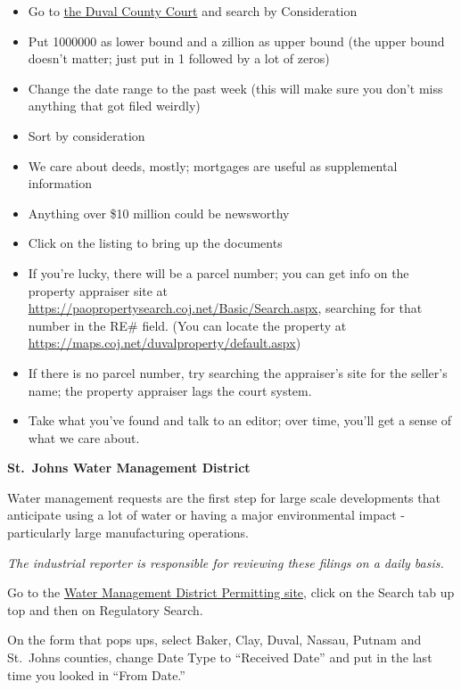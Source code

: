 \documentclass[
  11pt,
  american,
  letterpaperpaper,
  extrafontsizes,onecolumn,openright
  ]{memoir}
\providecommand{\tightlist}{%
  \setlength{\itemsep}{0pt}\setlength{\parskip}{0pt}}
\begin{document}
\begin{itemize}
\tightlist
\item
  Go to \href{https://oncore.duvalclerk.com/search/Disclaimer?st=/search/SearchTypeConsideration}{the Duval County Court} and search by Consideration
\item
  Put 1000000 as lower bound and a zillion as upper bound (the upper bound doesn't matter; just put in 1 followed by a lot of zeros)
\item
  Change the date range to the past week (this will make sure you don't miss anything that got filed weirdly)
\item
  Sort by consideration
\item
  We care about deeds, mostly; mortgages are useful as supplemental information
\item
  Anything over \$10 million could be newsworthy
\item
  Click on the listing to bring up the documents
\item
  If you're lucky, there will be a parcel number; you can get info on the property appraiser site at \url{https://paopropertysearch.coj.net/Basic/Search.aspx}, searching for that number in the RE\# field. (You can locate the property at \url{https://maps.coj.net/duvalproperty/default.aspx})
\item
  If there is no parcel number, try searching the appraiser's site for the seller's name; the property appraiser lags the court system.
\item
  Take what you've found and talk to an editor; over time, you'll get a sense of what we care about.
\end{itemize}

\newpage

\textbf{St.~Johns Water Management District}

Water management requests are the first step for large scale developments that anticipate using a lot of water or having a major environmental impact - particularly large manufacturing operations.

\emph{The industrial reporter is responsible for reviewing these filings on a daily basis.}

Go to the \href{https://permitting.sjrwmd.com/ep/\#/ep}{Water Management District Permitting site}, click on the Search tab up top and then on Regulatory Search.

On the form that pops ups, select Baker, Clay, Duval, Nassau, Putnam and St.~Johns counties, change Date Type to \enquote{Received Date} and put in the last time you looked in \enquote{From Date.}
\end{document}
